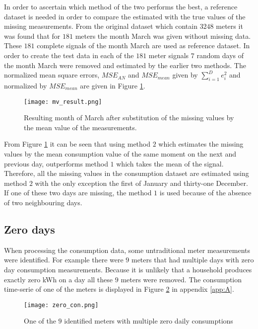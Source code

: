 In order to ascertain which method of the two performs the best, a reference dataset is needed in order to compare the estimated with the true values of the missing measurements. From the original dataset which contain $ 3248 $ meters it was found that for $ 181 $ meters the month March was given without missing data. These $ 181 $ complete signals of the month March are used as reference dataset. In order to create the test data in each of the $ 181  $ meter signals $ 7 $ random days of the month March were removed and estimated by the earlier two methods. The normalized mean square errors, $ MSE_{AN} $ and $ MSE_{mean} $ given by $ \sum_{i=1}^{D} e_i^2  $ and normalized by $ MSE_{mean} $ are given in Figure \ref{fig:mv_result}.

\begin{figure}[h!]
	\centering
	\texttt{[image: mv\_result.png]}
	\caption{Resulting month of March after substitution of the missing values by the mean value of the measurements. }
	\label{fig:mv_result}
\end{figure}

From Figure \ref{fig:mv_result} it can be seen that using method $ 2 $ which estimates the missing values by the mean consumption value of the same moment on the next and previous day, outperforms method $ 1 $ which takes the mean of the signal. Therefore, all the missing values in the consumption dataset are estimated using method $ 2 $ with the only exception the first of January and thirty-one December. If one of these two days are missing, the method $ 1 $ is used because of the absence of two neighbouring days. 


\subsection{Zero days}

When processing the consumption data, some untraditional meter measurements were identified. For example there were $ 9 $ meters that had multiple days with zero day consumption measurements. Because it is unlikely that a household produces exactly zero kWh on a day all these $ 9 $ meters were removed. The consumption time-serie of one of the meters is displayed in Figure \ref{fig:zero_con} in appendix \ref{app:A}.\\

\begin{figure}[h!]
	\centering
	\texttt{[image: zero\_con.png]}
	\vspace*{-5pt}
	\caption{One of the $9$ identified meters with multiple zero daily consumptions}
	\label{fig:zero_con}
\end{figure}


